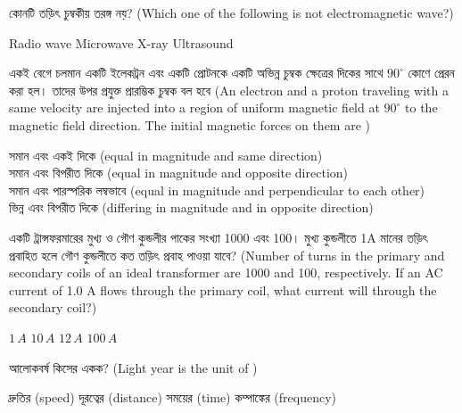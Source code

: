 \documentclass[addpoints]{exam}
\begin{document}
\begin{questions}
\question  কোনটি তড়িৎ চুম্বকীয় তরঙ্গ নয়? (Which one of the following is not electromagnetic wave?)

\begin{oneparchoices}
\choice Radio wave
\choice Microwave
\choice X-ray
\choice Ultrasound
\end{oneparchoices}

\question  একই বেগে চলমান একটি ইলেকট্রন এবং একটি প্রোটনকে একটি অভিন্ন চুম্বক ক্ষেত্রের দিকের সাথে $ 90^{\circ} $ কোণে প্রেরন করা হল। তাদের উপর প্রযুক্ত প্রারম্ভিক চুম্বক বল হবে (An electron and a proton traveling with a same velocity are injected into a region of uniform magnetic field at $ 90^{\circ} $ to the magnetic field direction. The initial magnetic forces on them are )

\begin{oneparchoices}
\choice সমান এবং একই দিকে (equal in magnitude and same direction)\\
\hspace*{-.3cm}\choice সমান এবং বিপরীত দিকে (equal in magnitude and opposite direction)\\
\hspace*{-.3cm}\choice সমান এবং পারস্পরিক লম্বভাবে (equal in magnitude and perpendicular to each other)\\
\hspace*{-.3cm}\choice ভিন্ন এবং বিপরীত দিকে (differing in magnitude and in opposite direction)
\end{oneparchoices}

\question  একটি ট্রান্সফরমারের মুখ্য ও গৌণ কুন্ডলীর পাকের সংখ্যা 1000 এবং 100। মুখ্য কুন্ডলীতে 1A মানের তড়িৎ প্রবাহিত হলে গৌণ কুন্ডলীতে কত তড়িৎ প্রবাহ পাওয়া যাবে? (Number of turns in the primary and secondary coils of an ideal transformer are 1000 and 100, respectively. If an AC current of 1.0 A flows through the primary coil, what current will through the secondary coil?)

\begin{oneparchoices}
\choice $ 1\,A $
\choice $ 10\,A $
\choice $ 12\,A $
\choice $ 100\,A $
\end{oneparchoices}

\question আলোকবর্ষ কিসের একক? (Light year is the unit of )

\begin{oneparchoices}
\choice দ্রুতির (speed)
\choice দূরত্বের (distance)
\choice  সময়ের (time)
\choice  কম্পাঙ্কের (frequency)
\end{oneparchoices}


\end{questions}
\end{document}
